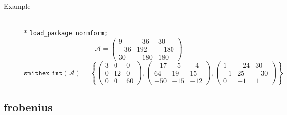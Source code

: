 \begin{description}
\item[Example]\mbox{}\\*
\texttt{load\_package normform;}
\[
 \mathcal{A} =
    \begin{pmatrix} 9 & -36 & 30 \\ -36 & 192 & -180 \\ 30 & -180 & 180 \end{pmatrix}
\]
\[
\mathtt{smithex\_int}(\mathcal{A}) =
\left\{ \begin{pmatrix} 3 & 0 & 0 \\ 0 & 12 & 0 \\ 0 & 0 & 60 \end{pmatrix},
        \begin{pmatrix} -17 & -5 & -4 \\ 64 & 19 & 15 \\ -50 & -15 & -12 \end{pmatrix},
        \begin{pmatrix} 1 & -24 & 30 \\ -1 & 25 & -30 \\ 0 & -1 & 1 \end{pmatrix} \right\}
\]
\end{description}

\subsection{frobenius}

